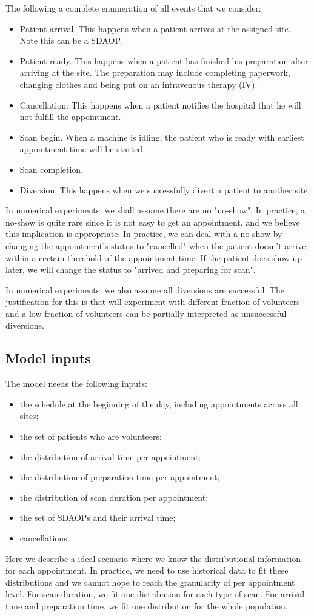 The following a complete enumeration of all events that we consider:
\begin{itemize}
\item Patient arrival. This happens when a patient arrives at
      the assigned site. Note this can be a SDAOP.
\item Patient ready. This happens when a patient has finished his preparation
      after arriving at the site. The preparation may include completing
      paperwork, changing clothes and being put on an intravenous therapy (IV).
\item Cancellation. This happens when a patient notifies the hospital
      that he will not fulfill the appointment.
\item Scan begin. When a machine is idling, the patient who is ready
      with earliest appointment time will be started.
\item Scan completion.
\item Diversion. This happens when we successfully divert a patient
      to another site. 
\end{itemize}
In numerical experiments, we shall assume there are no "no-show".
In practice, a no-show is quite rare since it is not easy to get an appointment,
and we believe this implication is appropriate. In practice, we can deal
with a no-show by changing the appointment's status to "cancelled"
when the patient doesn't arrive within a certain threshold of
the appointment time. If the patient does show up later, we will
change the status to "arrived and preparing for scan".

In numerical experiments, we also assume all diversions are successful.
The justification for this is that will experiment with different fraction of volunteers
and a low fraction of volunteers can be partially interpreted as
unsuccessful diversions.

\subsection{Model inputs}

The model needs the following inputs:
\begin{itemize}
\item the schedule at the beginning of the day, including
      appointments across all sites;
\item the set of patients who are volunteers;
\item the distribution of arrival time per appointment;
\item the distribution of preparation time per appointment;
\item the distribution of scan duration per appointment;
\item the set of SDAOPs and their arrival time;
\item cancellations.
\end{itemize}
Here we describe a ideal scenario where we know the distributional
information for each appointment. In practice, we need to
use historical data to fit these distributions and we cannot
hope to reach the granularity of per appointment level.
For scan duration, we fit one distribution for each type of scan.
For arrival time and preparation time, we fit one distribution
for the whole population. 

